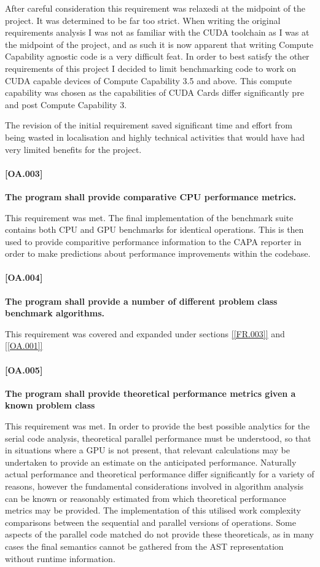 After careful consideration this requirement was relaxedi at the midpoint of the project. It was
determined to be far too strict. When writing the original requirements analysis I was not as
familiar with the CUDA toolchain as I was at the midpoint of the project, and as such it is now
apparent that writing Compute Capability agnostic code is a very difficult feat. In order to best
satisfy the other requirements of this project I decided to limit benchmarking code to work on CUDA
capable devices of Compute Capability 3.5 and above. This compute capability was chosen as the
capabilities of CUDA Cards differ significantly pre and post Compute Capability 3. 

The revision of the initial requirement saved significant time and effort from being wasted in
localisation and highly technical activities that would have had very limited benefits for the
project.

\paragraph{[OA.003]}
\textbf{The program shall provide comparative CPU performance metrics.}

This requirement was met. The final implementation of the benchmark suite contains both CPU and GPU
benchmarks for identical operations. This is then used to provide comparitive performance
information to the CAPA reporter in order to make predictions about performance improvements within
the codebase.

\paragraph{[OA.004]}
\textbf{The program shall provide a number of different problem class benchmark algorithms.}

This requirement was covered and expanded under sections \ref{[FR.003]} and \ref{[OA.001]}

\paragraph{[OA.005]} \label{[OA.005]}
\textbf{The program shall provide theoretical performance metrics given a known problem class}

This requirement was met. In order to provide the best possible analytics for the serial code
analysis, theoretical parallel performance must be understood, so that in situations where a GPU is
not present, that relevant calculations may be undertaken to provide an estimate on the anticipated
performance. Naturally actual performance and theoretical performance differ significantly for a
variety of reasons, however the fundamental considerations involved in algorithm analysis can be
known or reasonably estimated from which theoretical performance metrics may be provided. The
implementation of this utilised work complexity comparisons between the sequential and parallel
versions of operations.  Some aspects of the parallel code matched do not provide these
theoreticals, as in many cases the final semantics cannot be gathered from the AST representation
without runtime information.

